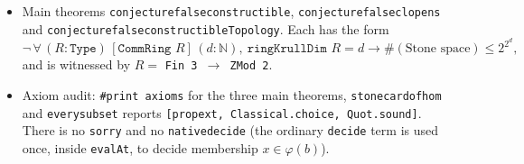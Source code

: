 \documentclass[11pt]{article}
\renewcommand{\_}{\oldus\allowbreak}
\theoremstyle{definition}
\theoremstyle{remark}
\begin{document}
\begin{itemize}
\begin{itemize}
  \end{itemize}
\item Main theorems \texttt{conjecture\_false\_constructible}, \texttt{conjecture\_false\_clopens} and
\texttt{conjecture\_false\_constructibleTopology}. Each has the form
\[
\neg\,\forall\,(R:\texttt{Type})\,[\texttt{CommRing }R]\,(d:\mathbb N),\
\texttt{ringKrullDim }R=d\to \#(\text{Stone space})\le 2^{2^d},
\]
and is witnessed by $R=$ \texttt{Fin 3 $\to$ ZMod 2}.
\item Axiom audit: \texttt{\#print axioms} for the three main theorems, \texttt{stone\_card\_of\_hom} and
\texttt{every\_subset} reports \texttt{[propext, Classical.choice, Quot.sound]}. There is no
\texttt{sorry} and no \texttt{native\_decide} (the ordinary \texttt{decide} term is used once, inside \texttt{evalAt}, to decide membership $x\in\varphi(b)$).
\end{itemize}
\end{document}
